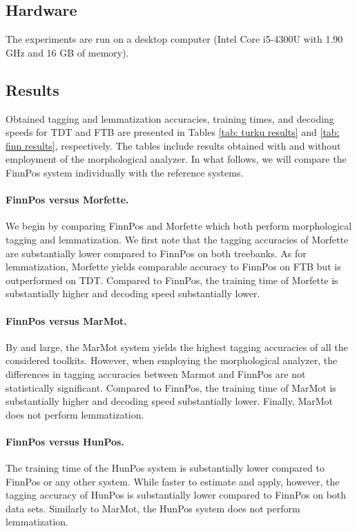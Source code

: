 \documentclass[smallextended]{svjour3}       %
\begin{document}
\subsection{Hardware}

The experiments are run on a desktop computer (Intel Core i5-4300U with 1.90 GHz and 16 GB of memory).

\subsection{Results}

Obtained tagging and lemmatization accuracies, training times, and decoding speeds for TDT and FTB are presented in Tables \ref{tab: turku results} and \ref{tab: finn results}, respectively. The tables include results obtained with and without employment of the morphological analyzer. In what follows, we will compare the FinnPos system individually with the reference systems. 

\paragraph{FinnPos versus Morfette.} We begin by comparing FinnPos and Morfette which both perform morphological tagging and lemmatization. We first note that the tagging accuracies of Morfette are substantially lower compared to FinnPos on both treebanks. As for lemmatization, Morfette yields comparable accuracy to FinnPos on FTB but is outperformed on TDT. Compared to FinnPos, the training time of Morfette is substantially higher and decoding speed substantially lower.

\paragraph{FinnPos versus MarMot.} By and large, the MarMot system yields the highest tagging accuracies of all the considered toolkits. However, when employing the morphological analyzer, the differences in tagging accuracies between Marmot and FinnPos are not statistically significant. Compared to FinnPos, the training time of MarMot is substantially higher and decoding speed substantially lower. Finally, MarMot does not perform lemmatization.

\paragraph{FinnPos versus HunPos.} The training time of the HunPos system is substantially lower compared to FinnPos or any other system. While faster to estimate and apply, however, the tagging accuracy of HunPos is substantially lower compared to FinnPos on both data sets. Similarly to MarMot, the HunPos system does not perform lemmatization. 
\end{document}

